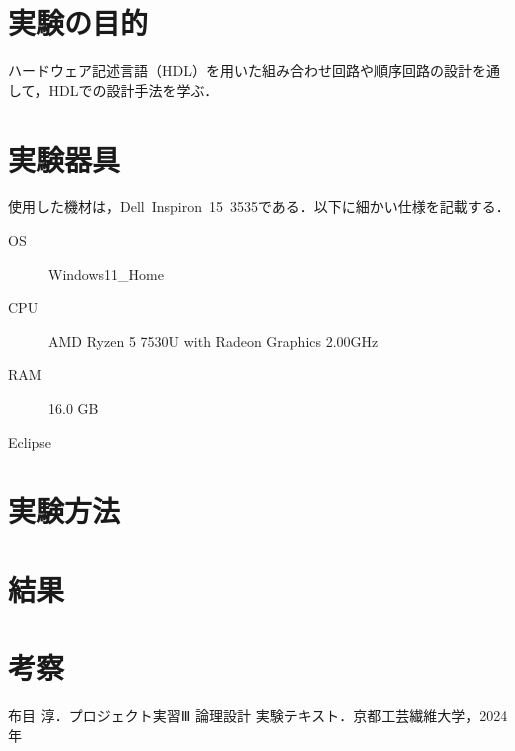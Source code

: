 \documentclass{jlreq}
\numberwithin{equation}{section}
\begin{document}
\tableofcontents
\clearpage

\section{実験の目的}
ハードウェア記述言語（HDL）を用いた組み合わせ回路や順序回路の設計を通して，HDLでの設計手法を学ぶ．

\section{実験器具}
使用した機材は，Dell\ Inspiron\ 15\ 3535である．以下に細かい仕様を記載する．

\begin{description}
  \item[OS] Windows11\_Home
  \item[CPU] AMD Ryzen 5 7530U with Radeon Graphics 2.00GHz
  \item[RAM] 16.0 GB
  \item[Eclipse]
\end{description}

\section{実験方法}

\section{結果}

\section{考察}

\begin{thebibliography}{9}
  \item 布目 淳．プロジェクト実習Ⅲ 論理設計 実験テキスト．京都工芸繊維大学，2024年
\end{thebibliography}
\end{document}

